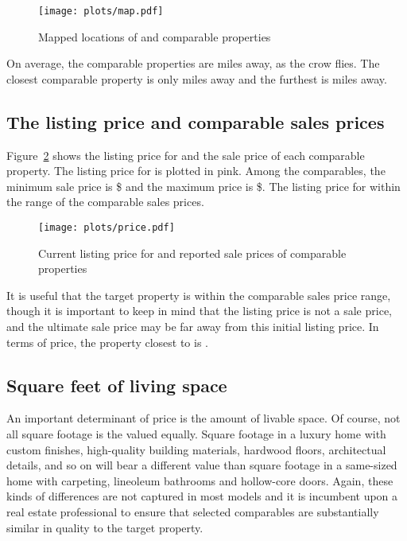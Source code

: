 \documentclass[
12pt, %
letterpaper, %
oneside, %
headinclude,footinclude, %
BCOR5mm, %
]{scrartcl}
\begin{document}
\begin{figure}[h!]
\centering
\caption{Mapped locations of \PropertyName{} and comparable properties}  \label{fig:map}  
\texttt{[image: plots/map.pdf]} 
\end{figure}

On average, the comparable properties are \AvgDistance{} miles away, as the crow flies.
The closest comparable property is only \MinDistance{} miles away and the furthest is \MaxDistance{} miles away.
\States{}
\Cities{}

\subsection{The listing price and comparable sales prices}

Figure~\ref{fig:price} shows the listing price for \PropertyName{} and the sale price of each comparable property.
The listing price for \PropertyName{} is plotted in pink. 
Among the comparables, the minimum sale price is \$\MinPrice{} and the maximum price is \$\MaxPrice{}.
The listing price for \PropertyName{} \InPriceRange{} within the range of the comparable sales prices. 

\begin{figure}[htb]
\centering
\caption{Current listing price for \PropertyName{} and reported sale prices of comparable properties} 
\label{fig:price}  
\texttt{[image: plots/price.pdf]} 
\end{figure}

It is useful that the target property is within the comparable sales price range, though it is important to keep in mind that the listing price is not a sale price, and the ultimate sale price may be far away from this initial listing price.
In terms of price, the property closest to \PropertyName{} is \ClosestOnPrice{}. 

\subsection{Square feet of living space}
An important determinant of price is the amount of livable space.
Of course, not all square footage is the valued equally.
Square footage in a luxury home with custom finishes, high-quality building materials, hardwood floors, architectual details, and so on will bear a different value than square footage in a same-sized home with carpeting, lineoleum bathrooms and hollow-core doors.
Again, these kinds of differences are not captured in most models and it is incumbent upon a real estate professional to ensure that selected comparables are substantially similar in quality to the target property. 
\end{document}
